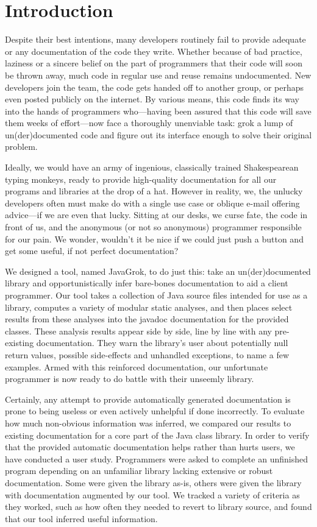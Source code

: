 \section{Introduction}

Despite their best intentions, many developers routinely fail to provide adequate or any documentation of the code they write.  Whether because of bad practice, laziness or a sincere belief on the part of programmers that their code will soon be thrown away, much code in regular use and reuse remains undocumented.  New developers join the team, the code gets handed off to another group, or perhaps even posted publicly on the internet.  By various means, this code finds its way into the hands of programmers who---having been assured that this code will save them weeks of effort---now face a thoroughly unenviable task: grok a lump of un(der)documented code and figure out its interface enough to solve their original problem.

Ideally, we would have an army of ingenious, classically trained Shakespearean typing monkeys, ready to provide high-quality documentation for all our programs and libraries at the drop of a hat.  However in reality, we, the unlucky developers often must make do with a single use case or oblique e-mail offering advice---if we are even that lucky.  Sitting at our desks, we curse fate, the code in front of us, and the anonymous (or not so anonymous) programmer responsible for our pain.  We wonder, wouldn't it be nice if we could just push a button and get some useful, if not perfect documentation?

We designed a tool, named JavaGrok, to do just this: take an un(der)documented library and opportunistically infer bare-bones documentation to aid a client programmer.  Our tool takes a collection of Java source files intended for use as a library, computes a variety of modular static analyses, and then places select results from these analyses into the javadoc documentation for the provided classes.  These analysis results appear side by side, line by line with any pre-existing documentation.  They warn the library's user about potentially null return values, possible side-effects and unhandled exceptions, to name a few examples.  Armed with this reinforced documentation, our unfortunate programmer is now ready to do battle with their unseemly library.

Certainly, any attempt to provide automatically generated documentation is prone
to being useless or even actively unhelpful if done incorrectly.  To evaluate
how much non-obvious information was inferred, we compared our results to
existing documentation for a core part of the Java class library.  In order to
verify that the provided automatic documentation helps rather than hurts users,
we have conducted a user study.  Programmers were asked to complete an
unfinished program depending on an unfamiliar library lacking extensive or
robust documentation.  Some were given the library as-is, others were given the
library with documentation augmented by our tool.  We tracked a variety of criteria as they worked, such as
how often they needed to revert to library source, and found that our tool
inferred useful information.
